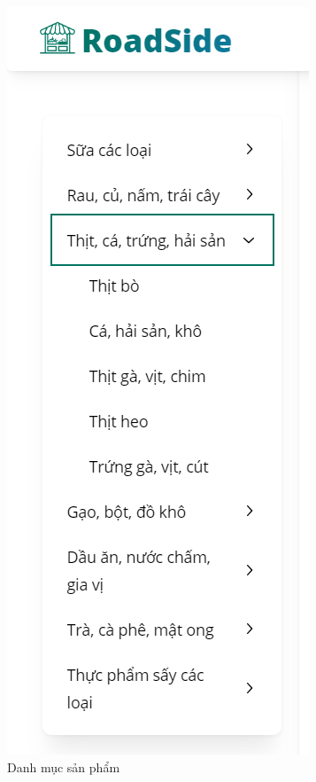 \begin{figure}[H]
    \includegraphics[scale=0.7] {Images/UI/category2.png}
    \vspace{1em}
    \caption{Danh mục sản phẩm}
\end{figure}

